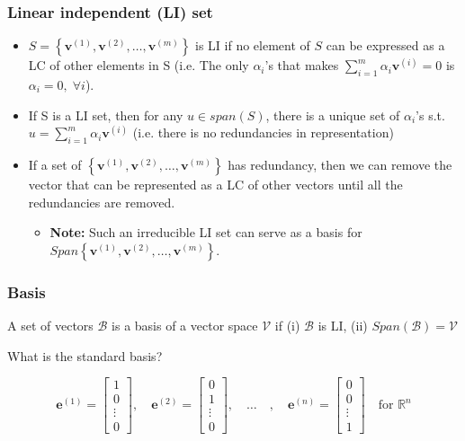 \subsubsection{Linear independent (LI) set}
\begin{definition}
    \begin{itemize}
        \item \( S = \left\{\mathbf{v}^{(1)}, \mathbf{v}^{(2)}, \ldots, \mathbf{v}^{(m)}\right\} \) is LI if no element of $S$ can be expressed as a LC of other elements in S (i.e. The only $\alpha_i$'s that makes $\sum_{i=1}^{m} \alpha_i \mathbf{v}^{(i)} = 0$ is $\alpha_i = 0, \; \forall i$).
        \item If S is a LI set, then for any $u\in span(S)$, there is a unique set of $\alpha_i$'s s.t. $u=\sum_{i=1}^{m} \alpha_i \mathbf{v}^{(i)}$ (i.e. there is no redundancies in representation)
        \item If a set of $\left\{\mathbf{v}^{(1)}, \mathbf{v}^{(2)}, \ldots, \mathbf{v}^{(m)}\right\}$ has redundancy, then we can remove the vector that can be represented as a LC of other vectors until all the redundancies are removed.
        \begin{itemize}
            \item \textbf{Note:} Such an irreducible LI set can serve as a basis for $Span\left\{\mathbf{v}^{(1)}, \mathbf{v}^{(2)}, \ldots, \mathbf{v}^{(m)}\right\}$.
        \end{itemize}
    \end{itemize}
\end{definition}

\subsubsection{Basis}
\begin{definition}
    A set of vectors $\mathcal{B}$ is a basis of a vector space $\mathcal{V}$ if (i) $\mathcal{B}$ is LI, (ii) $Span(\mathcal{B})=\mathcal{V}$
\end{definition}

\begin{example}
    What is the standard basis?
    \vspace{1em}

    \[
    \mathbf{e}^{(1)} = \begin{bmatrix}
    1 \\
    0 \\
    \vdots \\
    0
    \end{bmatrix}, \quad
    \mathbf{e}^{(2)} = \begin{bmatrix}
    0 \\
    1 \\
    \vdots \\
    0
    \end{bmatrix}, \quad \dots \quad, \quad
    \mathbf{e}^{(n)} = \begin{bmatrix}
    0 \\
    0 \\
    \vdots \\
    1
    \end{bmatrix}
    \quad \text{for } \mathbb{R}^n
    \]
\end{example}

